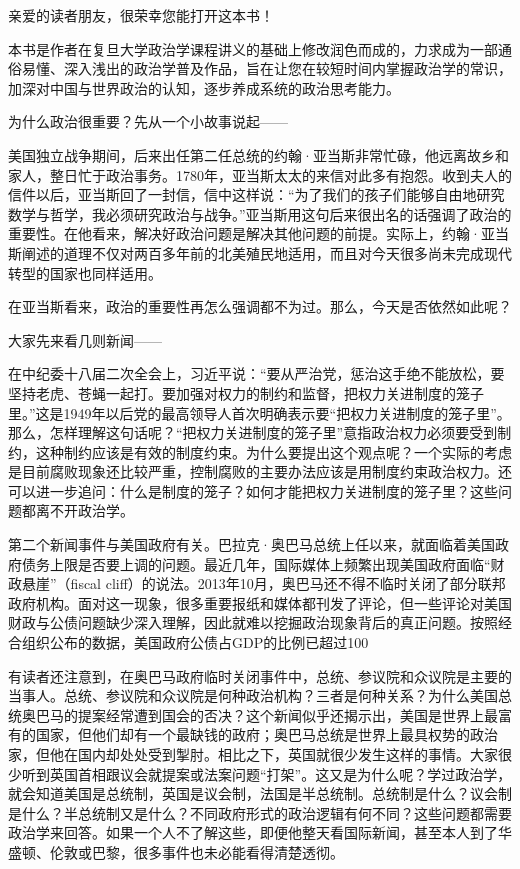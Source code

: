 
亲爱的读者朋友，很荣幸您能打开这本书！

本书是作者在复旦大学政治学课程讲义的基础上修改润色而成的，力求成为一部通俗易懂、深入浅出的政治学普及作品，旨在让您在较短时间内掌握政治学的常识，加深对中国与世界政治的认知，逐步养成系统的政治思考能力。

为什么政治很重要？先从一个小故事说起——

美国独立战争期间，后来出任第二任总统的约翰·亚当斯非常忙碌，他远离故乡和家人，整日忙于政治事务。1780年，亚当斯太太的来信对此多有抱怨。收到夫人的信件以后，亚当斯回了一封信，信中这样说：“为了我们的孩子们能够自由地研究数学与哲学，我必须研究政治与战争。”亚当斯用这句后来很出名的话强调了政治的重要性。在他看来，解决好政治问题是解决其他问题的前提。实际上，约翰·亚当斯阐述的道理不仅对两百多年前的北美殖民地适用，而且对今天很多尚未完成现代转型的国家也同样适用。

在亚当斯看来，政治的重要性再怎么强调都不为过。那么，今天是否依然如此呢？

大家先来看几则新闻——

在中纪委十八届二次全会上，习近平说：“要从严治党，惩治这手绝不能放松，要坚持老虎、苍蝇一起打。要加强对权力的制约和监督，把权力关进制度的笼子里。”这是1949年以后党的最高领导人首次明确表示要“把权力关进制度的笼子里”。那么，怎样理解这句话呢？“把权力关进制度的笼子里”意指政治权力必须要受到制约，这种制约应该是有效的制度约束。为什么要提出这个观点呢？一个实际的考虑是目前腐败现象还比较严重，控制腐败的主要办法应该是用制度约束政治权力。还可以进一步追问：什么是制度的笼子？如何才能把权力关进制度的笼子里？这些问题都离不开政治学。

第二个新闻事件与美国政府有关。巴拉克·奥巴马总统上任以来，就面临着美国政府债务上限是否要上调的问题。最近几年，国际媒体上频繁出现美国政府面临“财政悬崖”（fiscal cliff）的说法。2013年10月，奥巴马还不得不临时关闭了部分联邦政府机构。面对这一现象，很多重要报纸和媒体都刊发了评论，但一些评论对美国财政与公债问题缺少深入理解，因此就难以挖掘政治现象背后的真正问题。按照经合组织公布的数据，美国政府公债占GDP的比例已超过100%

有读者还注意到，在奥巴马政府临时关闭事件中，总统、参议院和众议院是主要的当事人。总统、参议院和众议院是何种政治机构？三者是何种关系？为什么美国总统奥巴马的提案经常遭到国会的否决？这个新闻似乎还揭示出，美国是世界上最富有的国家，但他们却有一个最缺钱的政府；奥巴马总统是世界上最具权势的政治家，但他在国内却处处受到掣肘。相比之下，英国就很少发生这样的事情。大家很少听到英国首相跟议会就提案或法案问题“打架”。这又是为什么呢？学过政治学，就会知道美国是总统制，英国是议会制，法国是半总统制。总统制是什么？议会制是什么？半总统制又是什么？不同政府形式的政治逻辑有何不同？这些问题都需要政治学来回答。如果一个人不了解这些，即便他整天看国际新闻，甚至本人到了华盛顿、伦敦或巴黎，很多事件也未必能看得清楚透彻。

